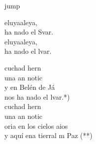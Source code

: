 \begin{cancion}jump\\
	\begin{chorus}%
		eluyaaleya,\\
		ha nado el Svar.\\
		eluyaaleya,\\
		ha nado el lvar.\jump\\
	\end{chorus}%
	cuchad hern\\
	una an notic \\
	y en Belén de Já\\
	nos ha nado el lvar.*)\\
	\jump
	cuchad hern\\
	una an notic  \\
	oria en los cielos aios\\
	y aquí ena tierral m Paz (**)\\
\end{cancion}%

